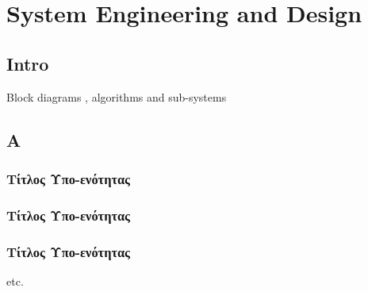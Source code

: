 \chapter{System Engineering and Design}
\label{chap3}

\section{Intro}
Block diagrams , algorithms and sub-systems

\section{A}

\subsection{Τίτλος Υπο-ενότητας}

\subsection{Τίτλος Υπο-ενότητας}

\subsection{Τίτλος Υπο-ενότητας}

etc.
